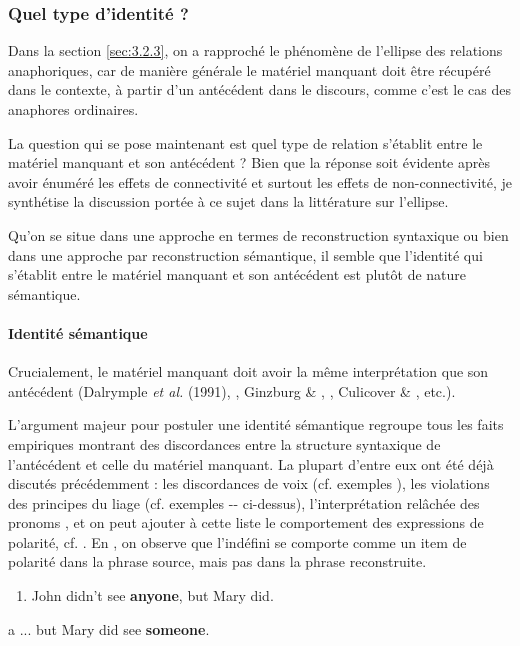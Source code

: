 \subsubsection{Quel type d'identité ?}
Dans la section \ref{sec:3.2.3}, on a rapproché le phénomène de l'ellipse des relations anaphoriques, car de manière générale le matériel manquant doit être récupéré dans le contexte, à partir d'un antécédent dans le discours, comme c'est le cas des anaphores ordinaires.

La question qui se pose maintenant est quel type de relation s'établit entre le matériel manquant et son antécédent ? Bien que la réponse soit évidente après avoir énuméré les effets de connectivité et surtout les effets de non-connectivité, je synthétise la discussion portée à ce sujet dans la littérature sur l'ellipse. 

Qu'on se situe dans une approche en termes de reconstruction syntaxique ou bien dans une approche par reconstruction sémantique, il semble que l'identité qui s'établit entre le matériel manquant et son antécédent est plutôt de nature sémantique. 

\paragraph[Identité sémantique]{Identité sémantique}
Crucialement, le matériel manquant doit avoir la même interprétation que son antécédent (Dalrymple \textit{et al.} (1991), \citet{Hardt1993}, Ginzburg \& \citet{Sag2000}, \citet{Merchant2001}, Culicover \& \citet{Jackendoff2005}, etc.). 

L'argument majeur pour postuler une identité sémantique regroupe tous les faits empiriques montrant des discordances entre la structure syntaxique de l'antécédent et celle du matériel manquant. La plupart d'entre eux ont été déjà discutés précédemment : les discordances de voix (cf. exemples ), les violations des principes du liage (cf. exemples -- ci-dessus), l'interprétation relâchée des pronoms , et on peut ajouter à cette liste le comportement des expressions de polarité, cf. \citet{Sag1976}. En , on observe que l'indéfini se comporte comme un item de polarité dans la phrase source, mais pas dans la phrase reconstruite. 


\begin{enumerate}
\item \label{bkm:Ref306044012}John didn't see \textbf{anyone}, but Mary did.  


\end{enumerate}
a  ... but Mary did see \textbf{someone}. 

